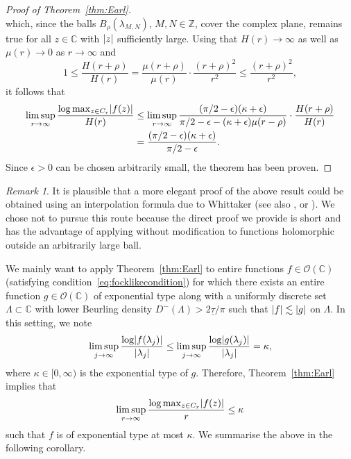 \documentclass{article}
\newcommand{\bbC}{\mathbb{C}}
\newcommand{\bbZ}{\mathbb{Z}}
\newcommand{\calO}{\mathcal{O}}
\DeclarePairedDelimiter{\abs}{\lvert}{\rvert}
\theoremstyle{remark}
\newtheorem{remark}{Remark}
\begin{document}
\begin{proof}[Proof of Theorem~\ref{thm:Earl}]
\begin{equation*}
        \end{equation*}
        which, since the balls $B_\rho(\lambda_{M,N})$, $M,N \in \bbZ$, cover the complex plane, remains true for all $z \in \bbC$ with $\abs{z}$ sufficiently large. Using that $H(r) \to \infty$ as well as $\mu(r) \to 0$ as $r \to \infty$ and 
        \begin{equation*}
            1 \leq \frac{H(r + \rho)}{H(r)} = \frac{\mu(r + \rho)}{\mu(r)} \cdot \frac{(r + \rho)^2}{r^2} \leq \frac{(r + \rho)^2}{r^2},
        \end{equation*}
        it follows that 
        \begin{align*}
            \limsup_{r \to \infty} \frac{\log \max_{z \in C_r} \abs{f(z)}}{H(r)} &\leq \limsup_{r \to \infty} \frac{(\pi/2-\epsilon)(\kappa+\epsilon)}{\pi/2 - \epsilon - (\kappa+\epsilon)\mu(r - \rho)} \cdot \frac{H(r + \rho)}{H(r)} \\
            &= \frac{(\pi/2-\epsilon)(\kappa+\epsilon)}{\pi/2 - \epsilon}.
        \end{align*}
        Since $\epsilon > 0$ can be chosen arbitrarily small, the theorem has been proven.
    \end{proof}

    \begin{remark}
        It is plausible that a more elegant proof of the above result could be obtained using an interpolation formula due to Whittaker \cite[Theorem~1 on p.~112]{Whittaker1930On} (see also \cite[Equation~(7) on p.~68]{Polya1934Bemerkung}, \cite[Equation~(1.4) on p.~306]{Pfluger1937On} or \cite[Equation~(10.1) on p.~202]{Pfluger1945Ueber}). We chose not to pursue this route because the direct proof we provide is short and has the advantage of applying without modification to functions holomorphic outside an arbitrarily large ball.
    \end{remark}

    We mainly want to apply Theorem~\ref{thm:Earl} to entire functions $f \in \calO(\bbC)$ (satisfying condition~\eqref{eq:focklikecondition}) for which there exists an entire function $g \in \calO(\bbC)$ of exponential type along with a uniformly discrete set $\Lambda \subset \bbC$ with lower Beurling density $D^{-}(\Lambda) > 2\underline \tau/\pi$ such that $\abs{f} \lesssim \abs{g}$ on $\Lambda$. In this setting, we note
    \begin{equation*}
        \limsup_{j \to \infty} \frac{\log \abs{f(\lambda_j)}}{\abs{\lambda_j}} \leq \limsup_{j \to \infty} \frac{\log \abs{g(\lambda_j)}}{\abs{\lambda_j}} = \kappa,
    \end{equation*}
    where $\kappa \in [0,\infty)$ is the exponential type of $g$. Therefore, Theorem~\ref{thm:Earl} implies that 
    \begin{equation}
        \limsup_{r \to \infty} \frac{\log \max_{z \in C_r} \abs{f(z)}}{r} \leq \kappa
    \end{equation}
    such that $f$ is of exponential type at most $\kappa$. We summarise the above in the following corollary.
\end{document}
